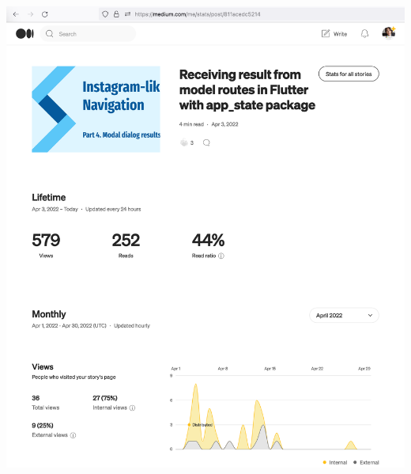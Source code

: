 \begin{center}
    \includegraphics[width=\textwidth]{2022-04-03_5_result}
\end{center}

\pagebreak
